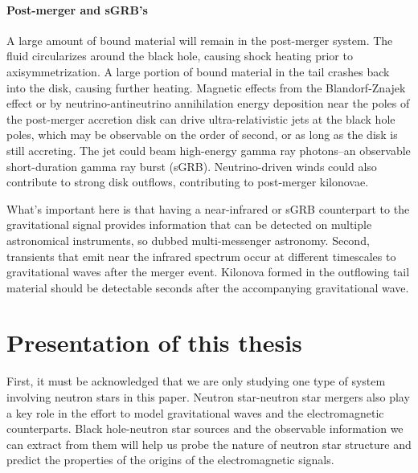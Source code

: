 \paragraph{Post-merger and sGRB's}
A large amount of bound material will remain in the post-merger system.  
The fluid circularizes around the black hole, causing shock heating prior to axisymmetrization. 
A large portion of bound material in the tail crashes back into the disk, causing further heating.
Magnetic effects from the Blandorf-Znajek effect or by neutrino-antineutrino annihilation energy deposition near the poles of the post-merger accretion disk can drive ultra-relativistic jets at the black hole poles, which may be observable on the order of second, or as long as the disk is still accreting.
The jet could beam high-energy gamma ray photons--an observable short-duration gamma ray burst (sGRB).
Neutrino-driven winds could also contribute to strong disk outflows, contributing to post-merger kilonovae.

What's important here is that having a near-infrared or sGRB counterpart to the gravitational signal provides information that can be detected on multiple astronomical instruments, so dubbed multi-messenger astronomy.
Second, transients that emit near the infrared spectrum occur at different timescales to gravitational waves after the merger event.
Kilonova formed in the outflowing tail material should be detectable seconds after the accompanying gravitational wave.  


\section{Presentation of this thesis}

First, it must be acknowledged that we are only studying one type of system involving neutron stars in this paper.  Neutron star-neutron star mergers also play a key role in the effort to model gravitational waves and the electromagnetic counterparts. 
Black hole-neutron star sources and the observable information we can extract from them will help us probe the nature of neutron star structure and predict the properties of the origins of the electromagnetic signals.

